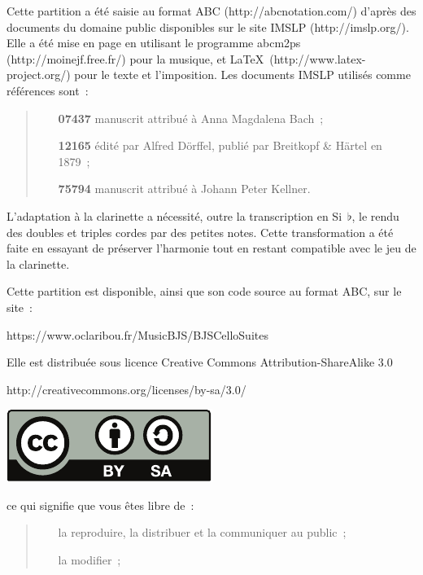 \documentclass[a4paper,twoside]{article}
\newcommand{\includerh}[3][0pt]{%
  \raisebox{#1}{\texttt{[image: \#3]}}%
}
\begin{document}
\vspace*{0pt plus 1 fill}
\normalsize
Cette partition a été saisie au format ABC (http://abcnotation.com/) d'après des documents du 
domaine public disponibles sur le site IMSLP (http://imslp.org/). Elle a été mise en page en 
utilisant le programme abcm2ps (http://moinejf.free.fr/) pour la musique, 
et \LaTeX\ (http://www.latex-project.org/) pour le texte et l'imposition.
Les documents IMSLP utilisés comme références sont~:
\begin{quote}
\begin{itemize}
  \item[\textbf{07437}] manuscrit attribué à Anna Magdalena Bach~;
  
  \item[\textbf{12165}] édité par Alfred Dörffel, publié par Breitkopf \& Härtel en 1879~;
  
  \item[\textbf{75794}] manuscrit attribué à Johann Peter Kellner.
\end{itemize}
\end{quote}

L'adaptation à la clarinette a nécessité, outre la transcription en Si~\(\flat\), le rendu des doubles 
et triples cordes par des petites notes. Cette transformation a été faite en essayant de préserver
l'harmonie tout en restant compatible avec le jeu de la clarinette.

\bigskip

Cette partition est disponible, ainsi que son code source au format ABC, sur le site~:

\smallskip

\centerline{https://www.oclaribou.fr/MusicBJS/BJSCelloSuites}

\bigskip

Elle est distribuée sous licence Creative Commons Attribution-ShareAlike 3.0

\centerline{http://creativecommons.org/licenses/by-sa/3.0/}

\medskip

\centerline{\includegraphics{inc/by-sa}}

\medskip

ce qui signifie que vous êtes libre de~:
\begin{quote}
\begin{itemize}
  \item[{\includerh[-2ex]{5ex}{inc/share}}] la reproduire, la distribuer et la communiquer au public~;
  
  \item[{\includerh[-2ex]{5ex}{inc/remix}}] la modifier~;
\end{itemize}
\end{quote}
\end{document}
